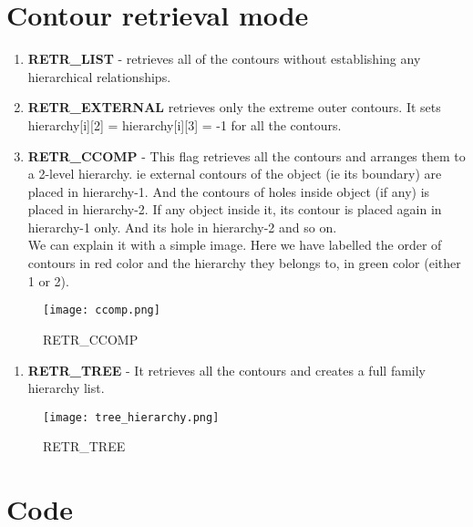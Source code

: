 \documentclass[]{article}
\providecommand{\tightlist}{%
  \setlength{\itemsep}{0pt}\setlength{\parskip}{0pt}}
\begin{document}
\section{Contour retrieval mode}\label{contour-retrieval-mode}

\begin{enumerate}
\def\labelenumi{\arabic{enumi}.}
\tightlist
\item
  \textbf{RETR\_LIST} - retrieves all of the contours without
  establishing any hierarchical relationships.\\
\item
  \textbf{RETR\_EXTERNAL} retrieves only the extreme outer contours. It
  sets hierarchy{[}i{]}{[}2{]} = hierarchy{[}i{]}{[}3{]} = -1 for all
  the contours.\\
\item
  \textbf{RETR\_CCOMP} - This flag retrieves all the contours and
  arranges them to a 2-level hierarchy. ie external contours of the
  object (ie its boundary) are placed in hierarchy-1. And the contours
  of holes inside object (if any) is placed in hierarchy-2. If any
  object inside it, its contour is placed again in hierarchy-1 only. And
  its hole in hierarchy-2 and so on.\\
  We can explain it with a simple image. Here we have labelled the order
  of contours in red color and the hierarchy they belongs to, in green
  color (either 1 or 2).
\end{enumerate}

\begin{figure}[htbp]
\centering
\texttt{[image: ccomp.png]}
\caption{RETR\_CCOMP}
\end{figure}

\begin{enumerate}
\def\labelenumi{\arabic{enumi}.}
\setcounter{enumi}{3}
\tightlist
\item
  \textbf{RETR\_TREE} - It retrieves all the contours and creates a full
  family hierarchy list.
\end{enumerate}

\begin{figure}[htbp]
\centering
\texttt{[image: tree\_hierarchy.png]}
\caption{RETR\_TREE}
\end{figure}

\section{Code}\label{code}
\end{document}
